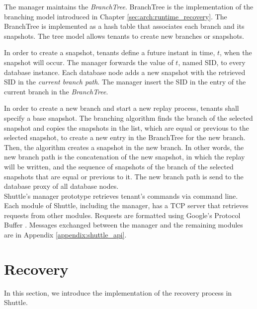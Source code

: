 The manager maintains the \textit{BranchTree}. BranchTree is the implementation of the branching model introduced in Chapter \ref{sec:arch:runtime_recovery}. The BranchTree is implemented as a hash table that associates each branch and its snapshots. The tree model allows tenants to create new branches or snapshots.

In order to create a snapshot, tenants define a future instant in time, $t$, when the snapshot will occur. The manager forwards the value of $t$, named \acf{SID}, to every database instance. Each database node adds a new snapshot with the retrieved \ac{SID} in the \emph{current branch path}. The manager insert the \ac{SID} in the entry of the current branch in the \emph{BranchTree}.

In order to create a new branch and start a new replay process, tenants shall specify a base snapshot. The branching algorithm finds the branch of the selected snapshot and copies the snapshots in the list, which are equal or previous to the selected snapshot, to create a new entry in the BranchTree for the new branch. Then, the algorithm creates a snapshot in the new branch. In other words, the new branch path is the concatenation of the new snapshot, in which the replay will be written, and the sequence of snapshots of the branch of the selected snapshots that are equal or previous to it. The new branch path is send to the database proxy of all database nodes.\\


Shuttle's manager prototype retrieves tenant's commands via command line. Each module of Shuttle, including the manager, has a TCP server that retrieves requests from other modules. Requests are formatted using Google's Protocol Buffer \cite{protobuffers}. Messages exchanged between the manager and the remaining modules are in Appendix \ref{appendix:shuttle_api}. 



\section{Recovery}\label{sec:impl:recovery}
In this section, we introduce the implementation of the recovery process in Shuttle.\\

